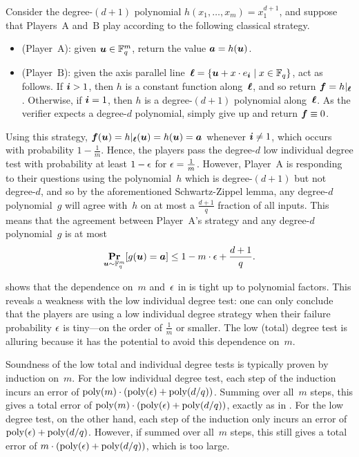 \begin{example}\label{ex:bad-individual-degree-example}
Consider the degree-$(d+1)$ polynomial $h(x_1, \ldots, x_m) = x_1^{d+1}$,
and suppose that Players~$\mathrm{A}$ and~$\mathrm{B}$ play according to the following classical strategy.
\begin{itemize}
\item[$\circ$] (Player~$\mathrm{A}$): given $\boldsymbol{u} \in \mathbb F_q^m$, return the value $\boldsymbol{a} = h(\boldsymbol{u})$.
\item[$\circ$] (Player~$\mathrm{B}$): given the axis parallel line~$\boldsymbol{\ell} = \{\boldsymbol{u} + x \cdot e_{\boldsymbol{i}} \mid x \in \mathbb F_q\}$, act as follows.
				If $\boldsymbol{i} > 1$, then $h$ is a constant function along~$\boldsymbol{\ell}$, and so return $\boldsymbol{f} = h|_{\boldsymbol{\ell}}$.
				Otherwise, if $\boldsymbol{i} = 1$, then $h$ is a degree-$(d+1)$ polynomial along~$\boldsymbol{\ell}$.
				As the verifier expects a degree-$d$ polynomial,
				simply give up and return $\boldsymbol{f} \equiv 0$.
\end{itemize}
Using this strategy, $\boldsymbol{f}(\boldsymbol{u}) = h|_{\boldsymbol{\ell}}(\boldsymbol{u}) = h(\boldsymbol{u}) = \boldsymbol{a}$ whenever $\boldsymbol{i} \neq 1$, which occurs with probability $1- \frac{1}{m}$.
Hence, the players pass the degree-$d$ low individual degree test with probability at least $1 -\epsilon$ for $\epsilon = \frac{1}{m}$.
However, Player~$\mathrm{A}$ is responding to their questions using the polynomial~$h$
which is degree-$(d+1)$ but not degree-$d$,
and so by the aforementioned Schwartz-Zippel lemma,
any degree-$d$ polynomial~$g$ will agree with~$h$ on at most a $\frac{d+1}{q}$ fraction of all inputs.
This means that the agreement between Player~$\mathrm{A}$'s strategy and any degree-$d$ polynomial~$g$ is at most
\begin{equation*}
\mathop{\bf Pr\/}_{\boldsymbol{u} \sim \mathbb F_q^m}[g(\boldsymbol{u}) = \boldsymbol{a}]
\leq 
1 - m \cdot \epsilon + \frac{d+1}{q}.
\end{equation*}
\end{example}

 shows that the dependence on~$m$ and~$\epsilon$ in  is tight up to polynomial factors.
This reveals a weakness with the low individual degree test:
one can only conclude that the players are using a low individual degree strategy
when their failure probability $\epsilon$ is tiny---on the order of $\frac{1}{m}$ or smaller.
The low (total) degree test is alluring because it has the potential to avoid this dependence on~$m$.

Soundness of the low total and individual degree tests
is typically proven by induction on~$m$.
For the low individual degree test,
each step of the induction incurs an error of $\mathrm{poly}(m) \cdot (\mathrm{poly}(\epsilon) + \mathrm{poly}(d/q))$.
Summing over all~$m$ steps, this gives a total error of $\mathrm{poly}(m) \cdot (\mathrm{poly}(\epsilon) + \mathrm{poly}(d/q))$,
exactly as in .
For the low degree test,
on the other hand, each step of the induction only incurs an error of $\mathrm{poly}(\epsilon) + \mathrm{poly}(d/q)$.
However, if summed over all~$m$ steps,
this still gives a total error of $m \cdot (\mathrm{poly}(\epsilon) + \mathrm{poly}(d/q))$,
which is too large.

